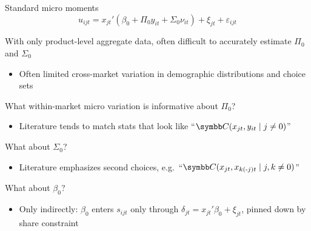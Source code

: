 \documentclass[aspectratio=169,10pt]{beamer}
\begin{document}
\begin{frame}[label=standard]{Standard micro moments}
    \begin{equation*}
        u_{ijt} = x_{jt}'(\beta_0 + \Pi_0 y_{it} + \Sigma_0 \nu_{it}) + \xi_{jt} + \varepsilon_{ijt}
    \end{equation*}
    
    \begin{wideitemize}
        \item With only product-level aggregate data, often difficult to accurately estimate $\Pi_0$ and $\Sigma_0$
        \begin{itemize}
            \item Often limited \alert{cross-market variation} in demographic distributions and choice sets
        \end{itemize}
        
        \item What \alert{within-market} micro variation is informative about $\Pi_0$?
        \begin{itemize}
            \item Literature tends to match stats that look like ``$\Cov(x_{jt}, y_{it} \mid j \neq 0)$''
        \end{itemize}
        
        \item What about $\Sigma_0$?
        \begin{itemize}
            \item Literature emphasizes \alert{second choices}, e.g.\ ``$\Cov(x_{jt}, x_{k(\text{-}j)t} \mid j, k \neq 0)$''
        \end{itemize}
        
        \item What about $\beta_0$?
        \begin{itemize}
            \item Only \alert{indirectly}: $\beta_0$ enters $s_{ijt}$ only through $\delta_{jt} = x_{jt}'\beta_0 + \xi_{jt}$, pinned down by share constraint
        \end{itemize}
    \end{wideitemize}
\end{frame}
\end{document}
